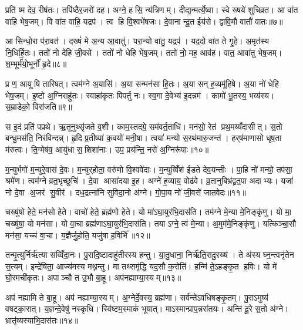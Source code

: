 प्रति॑ ष्म देव॒ रीष॑तः। तपि॑ष्ठैर॒जरो॑ दह। अग्ने॒ हसि॒ न्य॑त्रिणम्। दीद्य॒न्मर्त्ये॒ष्वा। स्वे ख्षये॑ शुचिव्रत। आ वा॑त वाहि भेष॒जम्। वि वा॑त वाहि॒ यद्रप॑। त्व हि वि॒श्वभे॑षजः। दे॒वानान्दू॒त ईय॑से। द्वावि॒मौ वातौ॑ वातः॥७॥

आ सिन्धो॒रा प॑रा॒वत॑। दख्षं॑ मे अ॒न्य आ॒वातु॑। परा॒न्यो वा॑तु॒ यद्रप॑। यद॒दो वा॑त ते गृ॒हे। अ॒मृत॑स्य नि॒धिर्\mbox{}हि॒तः। ततो॑ नो देहि जी॒वसे। ततो॑ नो धेहि भेष॒जम्। ततो॑ नो॒ मह॒ आव॑ह। वात॒ आवा॑तु भेष॒जम्। श॒म्भूर्म॑यो॒भूर्नो॑ हृ॒दे॥८॥

प्र ण॒ आयूषि तारिषत्। त्वम॑ग्ने अ॒यासि॑। अ॒या सन्मन॑सा हि॒तः। अ॒या सन् ह॒व्यमू॑हिषे। अ॒या नो॑ धेहि भेष॒जम्। इ॒ष्टो अ॒ग्निराहु॑तः। स्वाहा॑कृतः पिपर्तु नः। स्व॒गा दे॒वेभ्य॑ इ॒दन्नम॑। कामो॑ भू॒तस्य॒ भव्य॑स्य। स॒म्राडेको॒ विरा॑जति॥९॥

स इ॒दं प्रति॑ पप्रथे। ऋ॒तूनुथ्सृ॑जते व॒शी। काम॒स्तदग्रे॒ सम॑वर्त॒ताधि॑। मन॑सो॒ रेत॑ प्रथ॒मय्यँदासीत्। स॒तो बन्धु॒मस॑ति॒ निर॑विन्दन्न्। हृ॒दि प्र॒तीष्या॑ क॒वयो॑ मनी॒षा। त्वया॑ मन्यो स॒रथ॑मारु॒जन्त॑। हर्‌ष॑माणासो धृष॒ता म॑रुत्वः। ति॒ग्मेष॑व॒ आयु॑धा स॒शिशा॑नाः। उप॒ प्रय॑न्ति॒ नरो॑ अ॒ग्निरू॑पाः॥१०॥

म॒न्युर्भगो॑ म॒न्युरे॒वास॑ दे॒वः। म॒न्युर्‌होता॒ वरु॑णो वि॒श्ववे॑दाः। म॒न्युव्विँश॑ ईडते देव॒यन्तीः। पा॒हि नो॑ मन्यो॒ तप॑सा॒ श्रमे॑ण। त्वम॑ग्ने व्रत॒भृच्छुचि॑। दे॒वा आसा॑दया इ॒ह। अग्ने॑ ह॒व्याय॒ वोढ॑वे। व्र॒तानुबिभ्र॑द्व्रत॒पा अदाभ्यः। यजा॑ नो दे॒वा अ॒जर॑ सु॒वीर॑। दध॒द्रत्ना॑नि सुविदा॒नो अ॑ग्ने। गो॒पा॒य नो॑ जी॒वसे॑ जातवेदः॥११॥\anuvakamend[जिघासत्य॒मित्राञ्जघ॒न्वानी॑डते॒ सर्वा॒ अह॑सो वातो हृ॒दे रा॑जत्य॒ग्निरू॑पाः सुविदा॒नो अ॑ग्न॒ एक॑ञ्च]

चख्षु॑षो हेते॒ मन॑सो हेते। वाचो॑ हेते॒ ब्रह्म॑णो हेते। यो मा॑ऽघा॒युर॑भि॒दास॑ति। तम॑ग्ने मे॒न्या मे॒निङ्कृ॑णु। यो मा॒ चख्षु॑षा॒ यो मन॑सा। यो वा॒चा ब्रह्म॑णाऽघा॒युर॑भि॒दास॑ति। तयाऽग्ने॒ त्वं मे॒न्या। अ॒मुम॑मे॒निङ्कृ॑णु। यत्किञ्चा॒सौ मन॑सा॒ यच्च॑ वा॒चा। य॒ज्ञैर्जु॒होति॒ यजु॑षा ह॒विर्भि॑॥१२॥

तन्मृ॒त्युर्निर्\mbox{}ऋ॑त्या सव्विँदा॒नः। पु॒रादि॒ष्टादाहु॑तीरस्य हन्तु। या॒तु॒धाना॒ निर्\mbox{}ऋ॑ति॒रादु॒रख्ष॑। ते अ॑स्य घ्न॒न्त्वनृ॑तेन स॒त्यम्। इन्द्रे॑षिता॒ आज्य॑मस्य मथ्नन्तु। मा तथ्समृ॑द्धि॒ यद॒सौ क॒रोति॑। हन्मि॑ ते॒ऽहङ्कृ॒त ह॒विः। यो मे॑ घो॒रमची॑कृतः। अपाञ्चौ त उ॒भौ बा॒हू। अप॑नह्याम्या॒स्यम्॥१३॥

अप॑ नह्यामि ते बा॒हू। अप॑ नह्याम्या॒स्यम्। अ॒ग्नेर्दे॒वस्य॒ ब्रह्म॑णा। सर्व॑न्तेऽवधिषङ्कृ॒तम्। पु॒राऽमुष्य॑ वषट्का॒रात्। य॒ज्ञन्दे॒वेषु॑ नस्कृधि। स्वि॑ष्टम॒स्माकं॑ भूयात्। माऽस्मान्प्राप॒न्नरा॑तयः। अन्ति॑ दू॒रे स॒तो अ॑ग्ने। भ्रातृ॑व्यस्याभि॒दास॑तः॥१४॥

